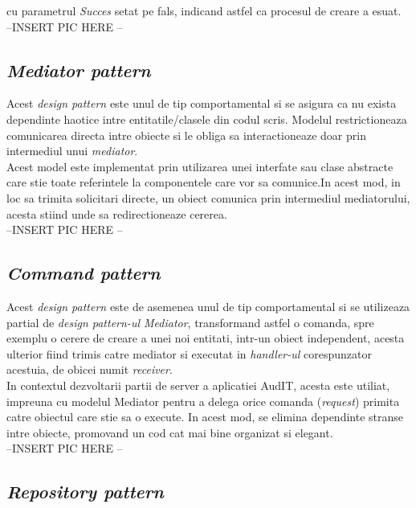  cu parametrul \textit{Succes} setat pe fals, indicand astfel ca procesul de creare a esuat.\\

--INSERT PIC HERE --\\

\subsection*{\textit{Mediator pattern}}
Acest \textit{design pattern} este unul de tip comportamental si se asigura ca nu exista dependinte haotice intre entitatile/clasele din codul scris. Modelul restrictioneaza comunicarea directa intre obiecte si le obliga sa interactioneaze doar prin intermediul unui \textit{mediator}.\\
Acest model este implementat prin utilizarea unei interfate sau clase abstracte care stie toate referintele la componentele care vor sa comunice.In acest mod, in loc sa trimita solicitari directe, un obiect comunica prin intermediul mediatorului, acesta stiind unde sa redirectioneaze cererea.\\


--INSERT PIC HERE --

	
\subsection*{\textit{Command pattern}}	
Acest \textit{design pattern} este de asemenea unul de tip comportamental si se utilizeaza partial de \textit{design pattern-ul Mediator}, transformand astfel o comanda, spre exemplu o cerere de creare a unei noi entitati, intr-un obiect independent, acesta ulterior fiind trimis catre mediator si executat in \textit{handler-ul} corespunzator acestuia, de obicei numit \textit{receiver}.\\
In contextul dezvoltarii partii de server a aplicatiei AudIT, acesta este utiliat, impreuna cu modelul Mediator pentru a delega orice comanda (\textit{request}) primita catre obiectul care stie sa o execute. In acest mod, se elimina dependinte stranse intre obiecte, promovand un cod cat mai bine organizat si elegant.\\

--INSERT PIC HERE -- \\


\subsection*{\textit{Repository pattern}}

